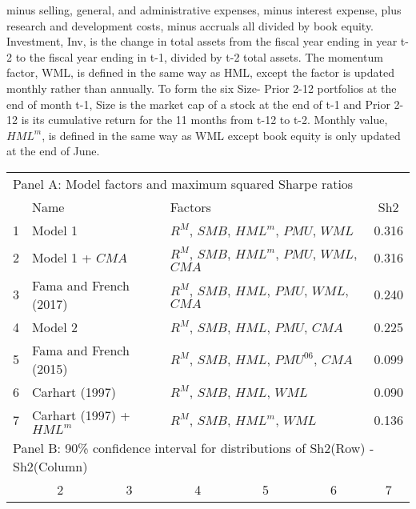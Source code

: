 \begin{table}[!ht]
{{minus selling, general, and administrative expenses, minus interest expense,
plus research and development costs, minus accruals all divided by book equity.
Investment, Inv, is the change in total assets from the fiscal year ending in
year t-2 to the fiscal year ending in t-1, divided by t-2 total assets. The
momentum factor, WML, is defined in the same way as HML, except the factor is
updated monthly rather than annually. To form the six Size- Prior 2-12
portfolios at the end of month t-1, Size is the market cap of a stock at the
end of t-1 and Prior 2-12 is its cumulative return for the 11 months from t-12
to t-2. Monthly value, $HML^m$, is defined in the same way as WML except book
equity is only updated at the end of June.
}
}
\begin{tabular}{lcccccc}
  \toprule
  \multicolumn{7}{l}{Panel A: Model factors and maximum squared Sharpe ratios} \\
        & \multicolumn{2}{l}{Name}                         & \multicolumn{3}{l}{Factors}                                   & Sh2   \\
  1     & \multicolumn{2}{l}{Model 1}                      & \multicolumn{3}{l}{$R^M$, $SMB$, $HML^m$, $PMU$, $WML$}        & 0.316 \\
  2     & \multicolumn{2}{l}{Model 1 + $CMA$}              & \multicolumn{3}{l}{$R^M$, $SMB$, $HML^m$, $PMU$, $WML$, $CMA$} & 0.316 \\
  3     & \multicolumn{2}{l}{Fama and French (2017)}       & \multicolumn{3}{l}{$R^M$, $SMB$, $HML$, $PMU$, $WML$, $CMA$}   & 0.240 \\
  4     & \multicolumn{2}{l}{Model 2}                      & \multicolumn{3}{l}{$R^M$, $SMB$, $HML$, $PMU$, $CMA$}          & 0.225 \\
  5     & \multicolumn{2}{l}{Fama and French (2015)}       & \multicolumn{3}{l}{$R^M$, $SMB$, $HML$, $PMU^{06}$, $CMA$}     & 0.099 \\
  6     & \multicolumn{2}{l}{Carhart (1997)}               & \multicolumn{3}{l}{$R^M$, $SMB$, $HML$, $WML$}                 & 0.090 \\
  7     & \multicolumn{2}{l}{Carhart (1997) + $HML^m$}     & \multicolumn{3}{l}{$R^M$, $SMB$, $HML^m$, $WML$}               & 0.136 \\
  \midrule
  \multicolumn{7}{l}{Panel B: 90\% confidence interval for distributions of Sh2(Row) - Sh2(Column)} \\
        &        2         &        3         &        4         &        5         &        6         &        7         \\

\end{tabular}
\end{table}
